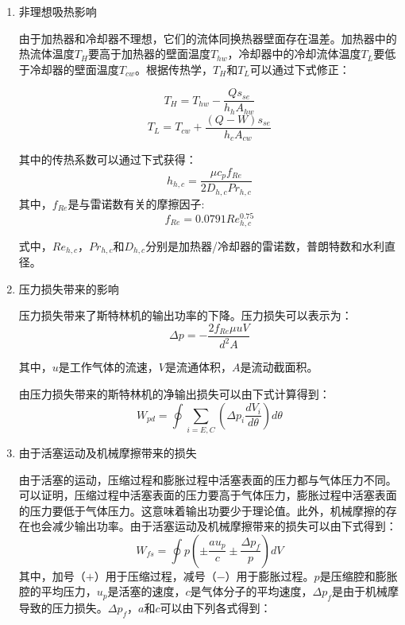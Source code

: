 \begin{enumerate}[label=(\arabic*)]
\item 非理想吸热影响

由于加热器和冷却器不理想，它们的流体同换热器壁面存在温差。加热器中的热流体温度$T_{H}$要高于加热器的壁面温度$T_{hw}$，冷却器中的冷却流体温度$T_L$要低于冷却器的壁面温度$T_{cw}$。根据传热学，$T_{H}$和$T_{L}$可以通过下式修正：

\begin{equation}
	T_H = T_{hw} - \frac{Qs_{se}}{h_hA_{hw}}
	\label{eq:T_H}
\end{equation}
\begin{equation}
	T_L = T_{cw} + \frac{(Q-W)s_{se}}{h_cA_{cw}}
	\label{eq:T_L}
\end{equation}

其中的传热系数可以通过下式获得\cite{Babaelahi2015}：
\begin{equation}
	h_{h,c} = \frac{\mu c_pf_{Re}}{2D_{h,c}Pr_{h,c}}
\end{equation}
其中，$f_{Re}$是与雷诺数有关的摩擦因子:
\begin{equation}
	f_{Re} = 0.0791Re_{h,c}^{0.75}
\end{equation}

式中，$Re_{h,c}$，$Pr_{h,c}$和$D_{h,c}$分别是加热器/冷却器的雷诺数，普朗特数和水利直径。

\item 压力损失带来的影响

压力损失带来了斯特林机的输出功率的下降。压力损失可以表示为\cite{Urieli1984}：
\begin{equation}
	\Delta p = -\frac{2f_{Re}\mu u V}{d^2A}
\end{equation}

其中，$u$是工作气体的流速，$V$是流通体积，$A$是流动截面积。

由压力损失带来的斯特林机的净输出损失可以由下式计算得到：
\begin{equation}
	W_{pd} = \oint\underset{i = E,C}{\sum}(\Delta p_{i}\frac{dV_i}{d\theta})d\theta
\end{equation}

\item 由于活塞运动及机械摩擦带来的损失

由于活塞的运动，压缩过程和膨胀过程中活塞表面的压力都与气体压力不同。可以证明，压缩过程中活塞表面的压力要高于气体压力，膨胀过程中活塞表面的压力要低于气体压力。这意味着输出功要少于理论值。此外，机械摩擦的存在也会减少输出功率。由于活塞运动及机械摩擦带来的损失可以由下式得到\cite{Babaelahi2015}：
\begin{equation}
	W_{fs} = \oint p(\pm\frac{au_p}{c}\pm\frac{\Delta p_f}{p})dV
\end{equation}
其中，加号（$+$）用于压缩过程，减号（$-$）用于膨胀过程。$p$是压缩腔和膨胀腔的平均压力，$u_p$是活塞的速度，$c$是气体分子的平均速度，$\Delta p_f$是由于机械摩导致的压力损失。$\Delta p_f$，$a$和$c$可以由下列各式得到：\cite{Heywood1988}


\end{enumerate}

